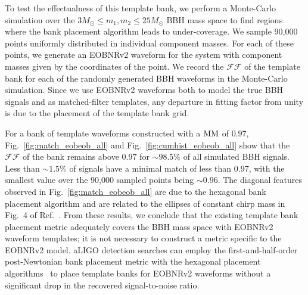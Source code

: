 To test the effectualness of this template bank, we perform a Monte-Carlo
simulation over the $3 M_\odot \le m_1, m_2 \le 25 M_\odot$ BBH mass space to
find regions where the bank placement algorithm leads to under-coverage.  We
sample 90,000 points uniformly distributed in individual component masses. For
each of these points, we generate an EOBNRv2 waveform for the system with
component masses given by the coordinates of the point.  We record the $\mathcal{FF}$ of the template
bank for each of the randomly generated BBH waveforms in the Monte-Carlo
simulation.  Since we use EOBNRv2 waveforms both to model the true BBH signals and
as matched-filter templates, any departure in fitting factor from unity is
due to the placement of the template bank grid. 

For a bank of template waveforms constructed with a $\mathrm{MM}$ of $0.97$,
Fig.~\ref{fig:match_eobeob_all} and Fig.~\ref{fig:cumhist_eobeob_all} show
that the $\mathcal{FF}$ of the bank remains above $0.97$ for $\sim 98.5\%$ of
all simulated BBH signals. Less than $\sim 1.5\%$ of signals have a minimal
match of less than 0.97, with the smallest value over the 90,000 sampled
points being $\sim 0.96$.  The diagonal features observed in
Fig.~\ref{fig:match_eobeob_all} are due to the hexagonal bank placement
algorithm and are related to the ellipses of constant chirp mass in Fig.~4  of
Ref.~\cite{BabaketalBankPlacement}.  From these results, we conclude that the
existing template bank placement metric adequately covers the BBH mass space
with EOBNRv2 waveform templates; it is not necessary to construct a metric
specific to the EOBNRv2 model. aLIGO detection searches can employ the
first-and-half-order post-Newtonian bank placement metric with the hexagonal
placement algorithms~\cite{SathyaMetric2PN,SathyaBankPlacementTauN,
BabaketalBankPlacement,OwenTemplateSpacing,Cokelaer:2007kx} to place template
banks for EOBNRv2 waveforms without a significant drop in the recovered signal-to-noise ratio.

